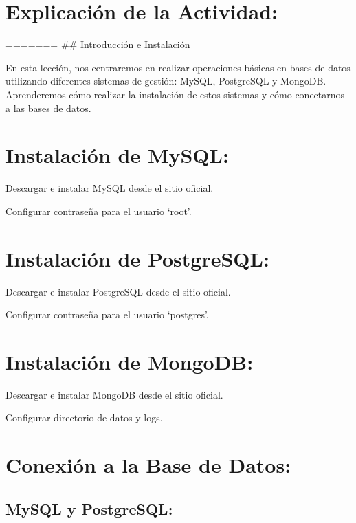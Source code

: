 \documentclass[
  a4paper,
  onepage,
  openany]{scrreprt}
\begin{document}
\hypertarget{explicaciuxf3n-de-la-actividad-70}{%
\section{Explicación de la
Actividad:}\label{explicaciuxf3n-de-la-actividad-70}}

======= \#\# Introducción e Instalación

En esta lección, nos centraremos en realizar operaciones básicas en
bases de datos utilizando diferentes sistemas de gestión: MySQL,
PostgreSQL y MongoDB. Aprenderemos cómo realizar la instalación de estos
sistemas y cómo conectarnos a las bases de datos.

\hypertarget{instalaciuxf3n-de-mysql-1}{%
\section{Instalación de MySQL:}\label{instalaciuxf3n-de-mysql-1}}

Descargar e instalar MySQL desde el sitio oficial.

Configurar contraseña para el usuario `root'.

\hypertarget{instalaciuxf3n-de-postgresql-3}{%
\section{Instalación de
PostgreSQL:}\label{instalaciuxf3n-de-postgresql-3}}

Descargar e instalar PostgreSQL desde el sitio oficial.

Configurar contraseña para el usuario `postgres'.

\hypertarget{instalaciuxf3n-de-mongodb-3}{%
\section{Instalación de MongoDB:}\label{instalaciuxf3n-de-mongodb-3}}

Descargar e instalar MongoDB desde el sitio oficial.

Configurar directorio de datos y logs.

\hypertarget{conexiuxf3n-a-la-base-de-datos-1}{%
\section{Conexión a la Base de
Datos:}\label{conexiuxf3n-a-la-base-de-datos-1}}

\hypertarget{mysql-y-postgresql-1}{%
\subsection{MySQL y PostgreSQL:}\label{mysql-y-postgresql-1}}
\end{document}
